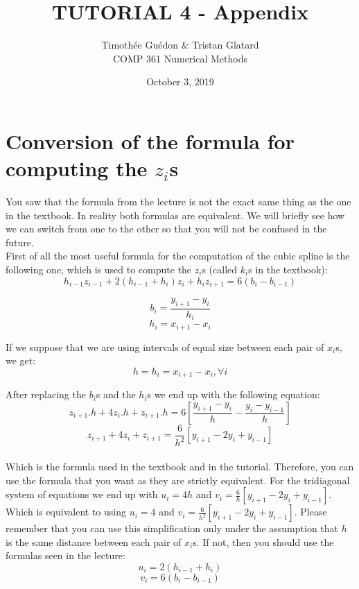 \documentclass[12pt]{article}
\begin{document}
\title{TUTORIAL 4 - Appendix}
\author{Timothée Guédon \& Tristan Glatard\\
COMP 361 Numerical Methods}
\date{October 3, 2019}
\maketitle

\section{Conversion of the formula for computing the $z_i$s}
You saw that the formula from the lecture is not the exact same thing as the one in the textbook.
In reality both formulas are equivalent. We will briefly see how we can switch from one to the other so that you will not be confused in the future. \\

First of all the most useful formula for the computation of the cubic spline is the following one, which is used to compute the $z_i$s (called $k_i$s in the textbook):
$$ h_{i-1}z_{i-1} + 2(h_{i-1} + h_i)z_i + h_iz_{i+1} = 6(b_i - b_{i-1}) $$

$$b_i = \frac{y_{i+1} - y_i}{h_i}$$
$$h_i = x_{i+1} - x_i$$

If we suppose that we are using intervals of equal size between each pair of $x_i$s, we get:
$$h = h_i = x_{i+1} - x_i, \forall i$$

After replacing the $b_i$s and the $h_i$s we end up with the following equation:
$$ z_{i+1}.h + 4z_i.h + z_{i+1}.h = 6 [\frac{y_{i+1} - y_i}{h} - \frac{y_{i} - y_{i-1}}{h}] $$
$$ z_{i+1} + 4z_i + z_{i+1} = \frac{6}{h^2} [y_{i+1} - 2y_i + y_{i-1}] $$ \\

Which is the formula used in the textbook and in the tutorial. Therefore, you can use the formula that you want as they are strictly equivalent. For the tridiagonal system of equations we end up with $u_i = 4h$ and $v_i = \frac{6}{h} [y_{i+1} - 2y_i + y_{i-1}] $. Which is equivalent to using $u_i = 4$ and $v_i = \frac{6}{h^2} [y_{i+1} - 2y_i + y_{i-1}] $. Please remember that you can use this simplification only under the assumption that $h$ is the same distance between each pair of $x_i$s. If not, then you should use the formulas seen in the lecture: \\
$$u_i = 2(h_{i-1} + h_i)$$
$$v_i = 6(b_i - b_{i-1})$$
\end{document}
